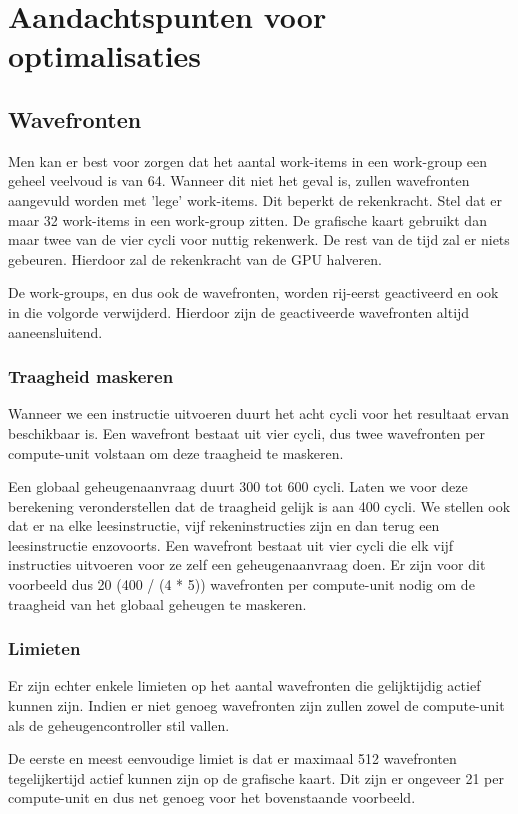 \section{Aandachtspunten voor optimalisaties}
\subsection{Wavefronten}
Men kan er best voor zorgen dat het aantal work-items in een work-group een geheel veelvoud is van 64. Wanneer dit niet het geval is, zullen wavefronten aangevuld worden met 'lege' work-items. Dit beperkt de rekenkracht. Stel dat er maar 32 work-items in een work-group zitten. De grafische kaart gebruikt dan maar twee van de vier cycli voor nuttig rekenwerk. De rest van de tijd zal er niets gebeuren. Hierdoor zal de rekenkracht van de GPU halveren.

De work-groups, en dus ook de wavefronten, worden rij-eerst geactiveerd en ook in die volgorde verwijderd\cite[p.~6-8]{amd}. Hierdoor zijn de geactiveerde wavefronten altijd aaneensluitend.

\subsubsection{Traagheid maskeren}
Wanneer we een instructie uitvoeren duurt het acht cycli voor het resultaat ervan beschikbaar is. Een wavefront bestaat uit vier cycli, dus twee wavefronten per compute-unit volstaan om deze traagheid te maskeren.

Een globaal geheugenaanvraag duurt 300 tot 600 cycli. Laten we voor deze berekening veronderstellen dat de traagheid gelijk is aan 400 cycli. We stellen ook dat er na elke leesinstructie, vijf rekeninstructies zijn en dan terug een leesinstructie enzovoorts. Een wavefront bestaat uit vier cycli die elk vijf instructies uitvoeren voor ze zelf een geheugenaanvraag doen. Er zijn voor dit voorbeeld dus 20 (400 / (4 * 5)) wavefronten per compute-unit nodig om de traagheid van het globaal geheugen te maskeren.

\subsubsection{Limieten}
Er zijn echter enkele limieten op het aantal wavefronten die gelijktijdig actief kunnen zijn. Indien er niet genoeg wavefronten zijn zullen zowel de compute-unit als de geheugencontroller stil vallen.

De eerste en meest eenvoudige limiet is dat er maximaal 512 wavefronten tegelijkertijd actief kunnen zijn op de grafische kaart. Dit zijn er ongeveer 21 per compute-unit en dus net genoeg voor het bovenstaande voorbeeld.


